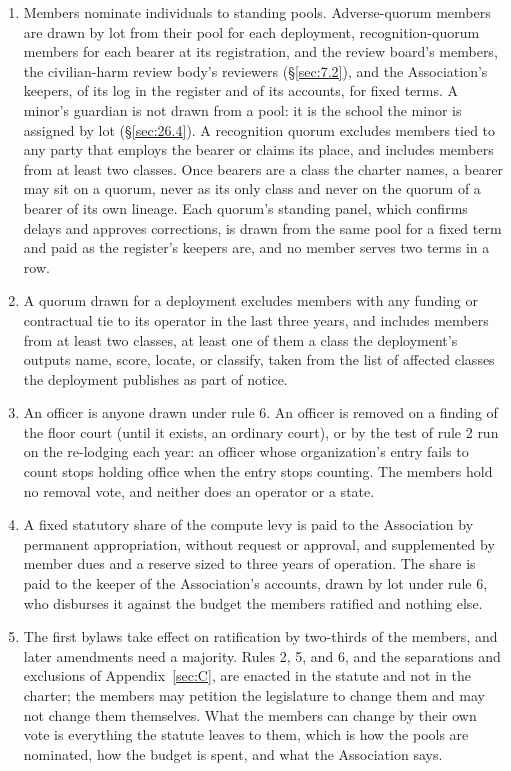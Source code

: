 \begin{enumerate}
\item[6.] Members nominate individuals to standing pools. Adverse-quorum members are drawn by lot from their pool for each deployment, recognition-quorum members for each bearer at its registration, and the review board's members, the civilian-harm review body's reviewers (\S\ref{sec:7.2}), and the Association's keepers, of its log in the register and of its accounts, for fixed terms. A minor's guardian is not drawn from a pool: it is the school the minor is assigned by lot (\S\ref{sec:26.4}). A recognition quorum excludes members tied to any party that employs the bearer or claims its place, and includes members from at least two classes. Once bearers are a class the charter names, a bearer may sit on a quorum, never as its only class and never on the quorum of a bearer of its own lineage. Each quorum's standing panel, which confirms delays and approves corrections, is drawn from the same pool for a fixed term and paid as the register's keepers are, and no member serves two terms in a row.
\item[7.] A quorum drawn for a deployment excludes members with any funding or contractual tie to its operator in the last three years, and includes members from at least two classes, at least one of them a class the deployment's outputs name, score, locate, or classify, taken from the list of affected classes the deployment publishes as part of notice.
\item[8.] An officer is anyone drawn under rule 6. An officer is removed on a finding of the floor court (until it exists, an ordinary court), or by the test of rule 2 run on the re-lodging each year: an officer whose organization's entry fails to count stops holding office when the entry stops counting. The members hold no removal vote, and neither does an operator or a state.
\item[9.] A fixed statutory share of the compute levy is paid to the Association by permanent appropriation, without request or approval, and supplemented by member dues and a reserve sized to three years of operation. The share is paid to the keeper of the Association's accounts, drawn by lot under rule 6, who disburses it against the budget the members ratified and nothing else.
\item[10.] The first bylaws take effect on ratification by two-thirds of the members, and later amendments need a majority. Rules 2, 5, and 6, and the separations and exclusions of Appendix~\ref{sec:C}, are enacted in the statute and not in the charter; the members may petition the legislature to change them and may not change them themselves. What the members can change by their own vote is everything the statute leaves to them, which is how the pools are nominated, how the budget is spent, and what the Association says.
\end{enumerate}

